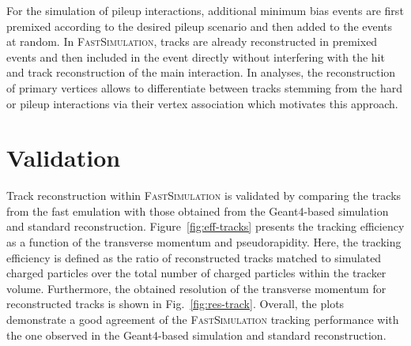 \documentclass[a4paper]{jpconf}
\begin{document}
For the simulation of pileup interactions, additional minimum bias events are first premixed according to the desired pileup scenario and then added to the events at random. In \textsc{FastSimulation}, tracks are already reconstructed in premixed events and then included in the event directly without interfering with the hit and track reconstruction of the main interaction. In analyses, the reconstruction of primary vertices allows to differentiate between tracks stemming from the hard or pileup interactions via their vertex association which motivates this approach.


\section{Validation}

Track reconstruction within \textsc{FastSimulation} is validated by comparing the tracks from the fast emulation with those obtained from the Geant4-based simulation and standard reconstruction. Figure~\ref{fig:eff-tracks} presents the tracking efficiency as a function of the transverse momentum and pseudorapidity. Here, the tracking efficiency is defined as the ratio of reconstructed tracks matched to simulated charged particles over the total number of charged particles within the tracker volume. Furthermore, the obtained resolution of the transverse momentum for reconstructed tracks is shown in Fig.~\ref{fig:res-track}. Overall, the plots demonstrate a good agreement of the \textsc{FastSimulation} tracking performance with the one observed in the Geant4-based simulation and standard reconstruction.
\end{document}
